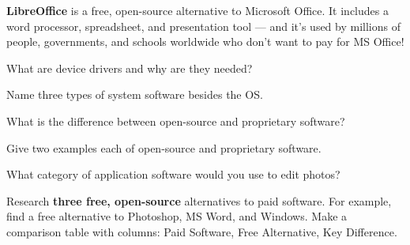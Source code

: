 \begin{funfact}
\textbf{LibreOffice} is a free, open-source alternative to Microsoft Office. It includes a word processor, spreadsheet, and presentation tool --- and it's used by millions of people, governments, and schools worldwide who don't want to pay for MS Office!
\end{funfact}

\begin{reviewqs}
  \item What are device drivers and why are they needed?
  \item Name three types of system software besides the OS.
  \item What is the difference between open-source and proprietary software?
  \item Give two examples each of open-source and proprietary software.
  \item What category of application software would you use to edit photos?
\end{reviewqs}

\begin{challenge}
Research \textbf{three free, open-source} alternatives to paid software. For example, find a free alternative to Photoshop, MS Word, and Windows. Make a comparison table with columns: Paid Software, Free Alternative, Key Difference.
\end{challenge}

